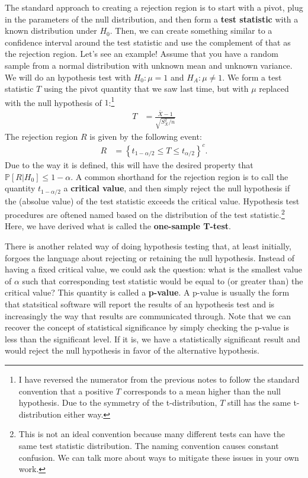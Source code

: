 \documentclass{tufte-handout}
\newcommand{\Prob}{\mathbb{P}}
\begin{document}
The standard approach to creating a rejection region is to start with a
pivot, plug in the parameters of the null distribution, and then form a
\textbf{test statistic} with a known distribution under $H_0$. Then, we
can create something similar to a confidence interval around the test
statistic and use the complement of that as the rejection region. Let's
see an example! Assume that you have a random sample from a normal 
distribution with unknown mean and unknown variance. We will do an 
hypothesis test with $H_0: \mu = 1$ and $H_A: \mu \neq 1$. We form a
test statistic $T$ using the pivot quantity that we saw last time, but
with $\mu$ replaced with the null hypothesis of $1$:\footnote{
  I have reversed the numerator from the previous notes to follow
  the standard convention that a positive $T$ corresponds to a mean
  higher than the null hypothesis. Due to the symmetry of the
  t-distribution, $T$ still has the same t-distribution either way.
}
\begin{align*}
T &= \frac{\bar{X} - 1}{\sqrt{S_X^2 / n}} 
\end{align*}
The rejection region $R$ is given by the following event:
\begin{align*}
R &= \left\{ t_{1 - \alpha/2} \leq T \leq t_{\alpha/2} \right\}^{c}.
\end{align*}
Due to the way it is defined, this will have the desired property that
$\Prob[R|H_0] \leq 1 - \alpha$. A common shorthand for the rejection
region is to call the quantity $t_{1 - \alpha/2}$ a \textbf{critical value},
and then simply reject the null hypothesis if the (absolue value) of the
test statistic exceeds the critical value. Hypothesis test procedures
are oftened named based on the distribution of the test statistic.\footnote{
  This is not an ideal convention because many different tests can have
  the same test statistic distribution. The naming convention causes constant
  confusion. We can talk more about ways to mitigate these issues in your own
  work.
}
Here, we have derived what is called the \textbf{one-sample T-test}. 

\vspace*{20pt}

\noindent
There is another related way of doing hypothesis testing that, at least
initially, forgoes the language about rejecting or retaining the null 
hypothesis. Instead of having a fixed critical value, we could ask the
question: what is the smallest value of $\alpha$ such that corresponding
test statistic would be equal to (or greater than) the critical value? 
This quantity is called a \textbf{p-value}. A p-value is usually the 
form that statsitical software will report the results of an hypothesis
test and is increasingly the way that results are communicated through.
Note that we can recover the concept of statistical significance by 
simply checking the p-value is less than the significant level. If it
is, we have a statistically significant result and would reject the null
hypothesis in favor of the alternative hypothesis.
\end{document}
